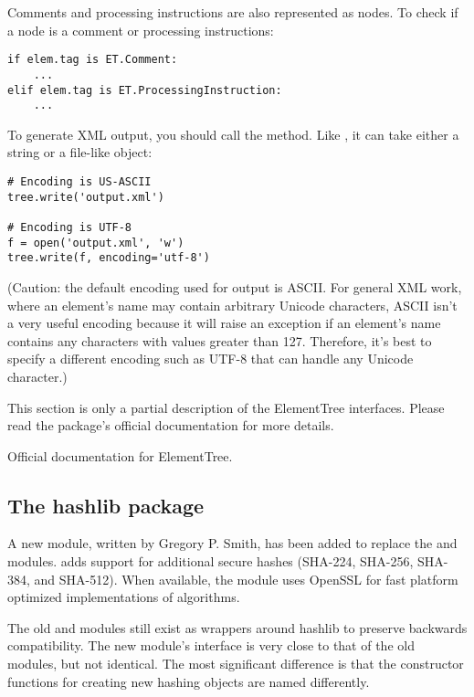 \documentclass{howto}
\begin{document}
Comments and processing instructions are also represented as
 nodes.  To check if a node is a comment or processing
instructions:

\begin{verbatim}
if elem.tag is ET.Comment:
    ...
elif elem.tag is ET.ProcessingInstruction:
    ...
\end{verbatim}

To generate XML output, you should call the
 method.  Like ,
it can take either a string or a file-like object:

\begin{verbatim}
# Encoding is US-ASCII
tree.write('output.xml')

# Encoding is UTF-8
f = open('output.xml', 'w')
tree.write(f, encoding='utf-8')
\end{verbatim}

(Caution: the default encoding used for output is ASCII.  For general
XML work, where an element's name may contain arbitrary Unicode
characters, ASCII isn't a very useful encoding because it will raise
an exception if an element's name contains any characters with values
greater than 127.  Therefore, it's best to specify a different
encoding such as UTF-8 that can handle any Unicode character.)

This section is only a partial description of the ElementTree interfaces.
Please read the package's official documentation for more details.

\begin{seealso}

{Official documentation for ElementTree.}

\end{seealso}


\subsection{The hashlib package\label{module-hashlib}}

A new  module, written by Gregory P. Smith, 
has been added to replace the
 and  modules.   adds support
for additional secure hashes (SHA-224, SHA-256, SHA-384, and SHA-512).
When available, the module uses OpenSSL for fast platform optimized
implementations of algorithms.  

The old  and  modules still exist as wrappers
around hashlib to preserve backwards compatibility.  The new module's
interface is very close to that of the old modules, but not identical.
The most significant difference is that the constructor functions
for creating new hashing objects are named differently.
\end{document}
